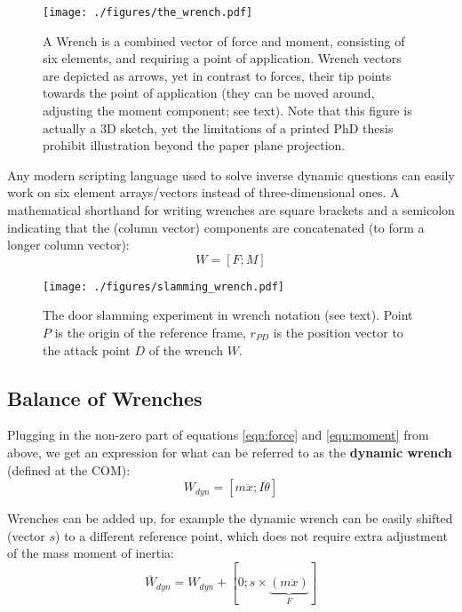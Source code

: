 \begin{figure}[p]
\centering
\texttt{[image: ./figures/the\_wrench.pdf]}
\caption{\label{fig:wrench}A Wrench is a combined vector of force and moment, consisting of six elements, and requiring a point of application. Wrench vectors are depicted as arrows, yet in contrast to forces, their tip points towards the point of application (they can be moved around, adjusting the moment component; see text). Note that this figure is actually a 3D sketch, yet the limitations of a printed PhD thesis prohibit illustration beyond the paper plane projection.}
\end{figure}


Any modern scripting language used to solve inverse dynamic questions can easily work on six element arrays/vectors instead of three-dimensional ones.
A mathematical shorthand for writing wrenches are square brackets and a semicolon indicating that the (column vector) components are concatenated (to form a longer column vector):
\[W = \left[ F; M \right]\]

\begin{figure}[p]
\centering
\texttt{[image: ./figures/slamming\_wrench.pdf]}
\caption{\label{fig:slamming_wrench}The door slamming experiment in wrench notation (see text). Point \(P\) is the origin of the reference frame, \(r_{PD}\) is the position vector to the attack point \(D\) of the wrench \(W\).}
\end{figure}


\FloatBarrier
\subsection{Balance of Wrenches}
\label{sec:org0fe158e}
Plugging in the non-zero part of equations \eqref{eqn:force} and \eqref{eqn:moment} from above, we get an expression for what can be referred to as the \textbf{dynamic wrench} (defined at the COM):
\begin{equation}\label{eqn:dynamic_wrench}
W_{dyn} = \left[ m\ddot x; I\ddot \theta \right]
\end{equation}

Wrenches can be added up, for example the dynamic wrench can be easily shifted (vector \(s\)) to a different reference point, which does not require extra adjustment of the mass moment of inertia:
\begin{equation}\label{eqn:shift_wrench}
\bar W_{dyn} = W_{dyn} + [ 0; s \times \underbrace{(m\ddot x)}_{F} ]
\end{equation}


